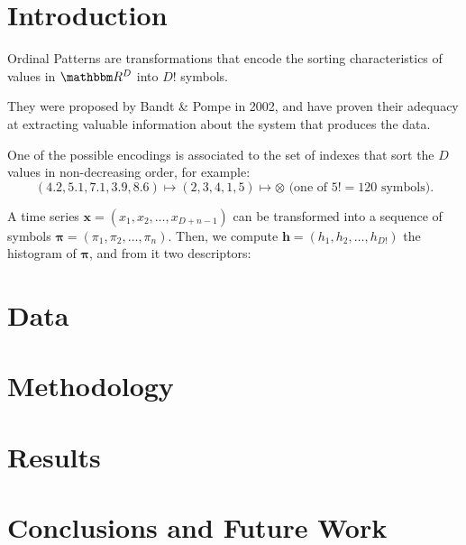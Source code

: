 \documentclass[a0,portrait]{a0poster}
\begin{document}
\begin{mdframed}[style=MyFrame]

\begin{multicols}{2} %



\section{Introduction}

Ordinal Patterns are transformations that encode the sorting characteristics of values in $\mathbbm R^D$ into $D!$ symbols.

They were proposed by Bandt \& Pompe in 2002, and have proven their adequacy at extracting valuable information about the system that produces the data.

One of the possible encodings is associated to the set of indexes that sort the $D$ values in non-decreasing order, for example:
$$
(4.2, 5.1, 7.1, 3.9, 8.6) \longmapsto (2, 3, 4, 1, 5) \longmapsto \otimes \text{ (one of }5!=120 \text{ symbols)}.
$$

A time series $\bm x = (x_1,x_2,\dots,x_{D+n-1})$ can be transformed into a sequence of symbols $\bm \pi=(\pi_1,\pi_2,\dots,\pi_n)$.
Then, we compute $\bm h =(h_1,h_2,\dots,h_{D!})$ the histogram of $\bm \pi$, and from it two descriptors:

\section{Data}\label{section:1}

\section{Methodology}\label{section2}

\section{Results}\label{section4}


\section{Conclusions and Future Work}


\end{multicols}
\end{mdframed}
\end{document}
